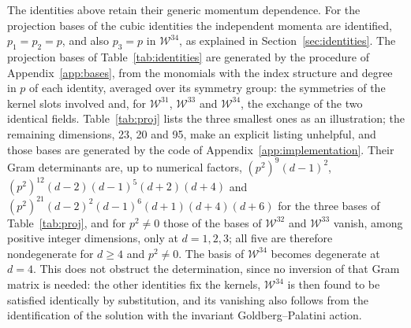 \documentclass[prd,aps,preprint,superscriptaddress,nofootinbib,amsmath,amssymb,eqsecnum]{revtex4-2}
\newcommand{\W}{\mathcal{W}}
\begin{document}
The identities above retain their generic momentum dependence. For the projection bases
of the cubic identities the independent momenta are identified, $p_1=p_2=p$, and also
$p_3=p$ in $\W^{34}$, as explained in Section~\ref{sec:identities}. The projection bases of
Table~\ref{tab:identities} are generated by the procedure of Appendix~\ref{app:bases}, from
the monomials with the index structure and degree in $p$ of each identity, averaged over its
symmetry group: the symmetries of the kernel slots involved
and, for $\W^{31}$, $\W^{33}$ and $\W^{34}$, the exchange of the two identical fields.
Table~\ref{tab:proj} lists the three smallest ones as an illustration; the remaining
dimensions, 23, 20 and 95, make an explicit listing unhelpful, and those bases are generated
by the code of Appendix~\ref{app:implementation}. Their Gram determinants are, up to
numerical factors, $(p^2)^9(d-1)^2$, $(p^2)^{12}(d-2)(d-1)^5(d+2)(d+4)$ and
$(p^2)^{21}(d-2)^2(d-1)^6(d+1)(d+4)(d+6)$ for the three bases of Table~\ref{tab:proj}, and
for $p^2\neq0$ those of the bases of $\W^{32}$ and $\W^{33}$ vanish, among positive
integer dimensions, only at $d=1,2,3$; all five are therefore nondegenerate for $d\geq4$ and
$p^2\neq0$. The basis of $\W^{34}$ becomes degenerate at $d=4$. This does not obstruct the
determination, since no inversion of that Gram matrix is needed: the other identities fix
the kernels, $\W^{34}$ is then found to be satisfied identically by substitution, and its
vanishing also follows from the identification of the solution with the invariant
Goldberg--Palatini action.
\end{document}
